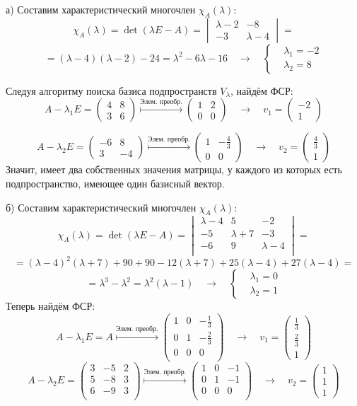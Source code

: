 \documentclass[a4paper,12pt]{article}
\newcommand{\ssolve}{\par\vspace{5pt}\noindent{\bf Решение. }\par}
\newcommand{\bpm}{\begin{pmatrix}}
\newcommand{\epm}{\end{pmatrix}}
\newcommand{\bvm}{\begin{vmatrix}}
\newcommand{\evm}{\end{vmatrix}}
\newcommand{\bal}{\left\{\begin{aligned}}
\newcommand{\eal}{\end{aligned}\right.}
\newcommand{\llaq}{\quad \longrightarrow \quad}
\newcommand{\ao}[1]{\overset{#1}{\longmapsto}}
\begin{document}
\ssolve
а) Составим характеристический многочлен $\chi_A(\lambda)$:
$$\chi_A(\lambda)=
\det(\lambda E - A)=
\bvm
\lambda - 2 & -8 \\
-3 & \lambda - 4
\evm
=$$
$$
=(\lambda - 4)(\lambda -2)-24= 
\lambda^2-6\lambda-16 
\llaq
\bal
&\lambda_1 = -2 \\
&\lambda_2 = 8
\eal
$$

Следуя алгоритму поиска базиса подпространств $V_\lambda$, найдём ФСР:
$$
A-\lambda_1 E = \bpm
4 & 8 \\
3 & 6 
\epm
\ao{\text{Элем. преобр.}}
\bpm
1 & 2 \\
0 & 0
\epm
\llaq 
v_1 = 
\bpm
-2 \\ 1
\epm
$$

$$
A-\lambda_2 E = \bpm
-6 & 8 \\
3 & -4 
\epm
\ao{\text{Элем. преобр.}}
\bpm
1 & -\frac{4}{3} \\
0 & 0
\epm
\llaq 
v_2 = 
\bpm
\frac{4}{3} \\ 1
\epm
$$
Значит, имеет два собственных значения матрицы, у каждого из которых есть подпространство, имеющее один базисный вектор.\par
\vspace{5pt}
б) Составим характеристический многочлен $\chi_A(\lambda)$:
$$\chi_A(\lambda)=
\det(\lambda E - A)=
\bvm
{\lambda - 4}&{5}&{-2}\\
{-5}&{\lambda +7}&{-3}\\
{-6}&{9}&{\lambda - 4}\\
\evm =$$
$$
=(\lambda-4)^2(\lambda+7)+90+90-12(\lambda+7)+25(\lambda-4)+27(\lambda-4)=
$$
$$=\lambda^3-\lambda^2=\lambda^2(\lambda-1) 
\llaq
\bal
&\lambda_1 = 0 \\
&\lambda_2 = 1
\eal
$$
Теперь найдём ФСР:
$$
A-\lambda_1 E = A 
\ao{\text{Элем. преобр.}}
\bpm
{1}&{0}&{-\frac{1}{3}}\\
{0}&{1}&{-\frac{2}{3}}\\
{0}&{0}&{0}\\
\epm
\llaq 
v_1 = 
\bpm
\frac{1}{3} \\ \frac{2}{3} \\ 1
\epm
$$
$$
A- \lambda_2 E = 
\bpm
{3}&{-5}&{2}\\
{5}&{-8}&{3}\\
{6}&{-9}&{3}\\
\epm
\ao{\text{Элем. преобр.}}
\bpm
{1}&{0}&{-1}\\
{0}&{1}&{-1}\\
{0}&{0}&{0}\\
\epm
\llaq 
v_2 = 
\bpm
1 \\ 1 \\ 1
\epm
$$
\end{document}
